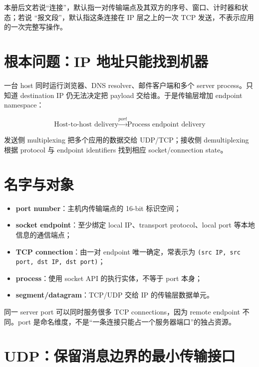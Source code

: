 \documentclass[UTF8,fontset=none,11pt,a4paper]{ctexart}
\providecommand{\tightlist}{\setlength{\itemsep}{0pt}\setlength{\parskip}{0pt}}
\providecommand{\passthrough}[1]{#1}
\begin{document}
本册后文若说“连接”，默认指一对传输端点及其双方的序号、窗口、计时器和状态；若说
“报文段”，默认指这条连接在 IP 层之上的一次 TCP 发送，不表示应用的一次完整写操作。

\section{根本问题：IP
地址只能找到机器}\label{1-ux6839ux672cux95eeux9898ip-ux5730ux5740ux53eaux80fdux627eux5230ux673aux5668}

一台 host 同时运行浏览器、DNS resolver、邮件客户端和多个 server
process。只知道 destination IP 仍无法决定把 payload
交给谁。于是传输层增加 endpoint namespace：

\[
\boxed{
\text{Host-to-host delivery}
\xrightarrow{port}
\text{Process endpoint delivery}
}
\]

发送侧 multiplexing 把多个应用的数据交给 UDP/TCP；接收侧 demultiplexing
根据 protocol 与 endpoint identifiers 找到相应 socket/connection state。

\section{名字与对象}\label{2-ux540dux5b57ux4e0eux5bf9ux8c61}

\begin{itemize}
\tightlist
\item
  \textbf{port number}：主机内传输端点的 16-bit 标识空间；
\item
  \textbf{socket endpoint}：至少绑定 local IP、transport protocol、local
  port 等本地信息的通信端点；
\item
  \textbf{TCP connection}：由一对 endpoint 唯一确定，常表示为
  \passthrough{\lstinline!(src IP, src port, dst IP, dst port)!}；
\item
  \textbf{process}：使用 socket API 的执行实体，不等于 port 本身；
\item
  \textbf{segment/datagram}：TCP/UDP 交给 IP 的传输层数据单元。
\end{itemize}

同一 server port 可以同时服务很多 TCP connections，因为 remote endpoint
不同。port 是命名维度，不是``一条连接只能占一个服务器端口''的独占资源。

\section{UDP：保留消息边界的最小传输接口}\label{3-udpux4fddux7559ux6d88ux606fux8fb9ux754cux7684ux6700ux5c0fux4f20ux8f93ux63a5ux53e3}
\end{document}
